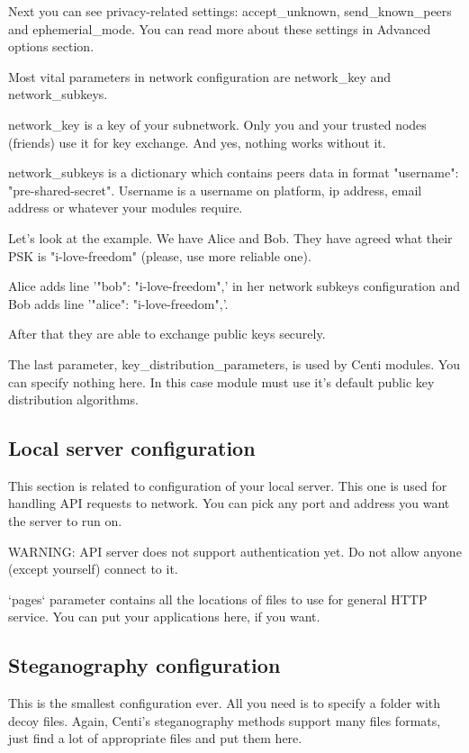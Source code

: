 \documentclass{article}
\begin{document}
	Next you can see privacy-related settings: accept\_unknown, send\_known\_peers and
	ephemerial\_mode. You can read more about these settings in Advanced options section.

	Most vital parameters in network configuration are network\_key and network\_subkeys.

	network\_key is a key of your subnetwork. Only you and your trusted nodes (friends)
	use it for key exchange. And yes, nothing works without it.

	network\_subkeys is a dictionary which contains peers data in format
	"username": "pre-shared-secret". Username is a username on platform,
	ip address, email address or whatever your modules require.

	Let's look at the example.
	We have Alice and Bob. They have agreed what their PSK is "i-love-freedom" (please, use
	more reliable one).

	Alice adds line '"bob": "i-love-freedom",' in her network subkeys configuration and Bob adds line
	'"alice": "i-love-freedom",'.
	
	After that they are able to exchange public keys securely.

	The last parameter, key\_distribution\_parameters, is used by Centi modules. You can specify
	nothing here. In this case module must use it's default public key distribution algorithms.

	\subsection{Local server configuration}
	This section is related to configuration of your local server. This one is used
	for handling API requests to network. You can pick any port and address you want
	the server to run on.
	
	WARNING: API server does not support authentication yet. Do not allow anyone
	(except yourself) connect to it.

	`pages` parameter contains all the locations of files to use for general HTTP service.
	You can put your applications here, if you want.

	\subsection{Steganography configuration}
	This is the smallest configuration ever. All you need is to specify a folder with decoy files.
	Again, Centi's steganography methods support many files formats, just find a lot of appropriate
	files and put them here.
\end{document}
